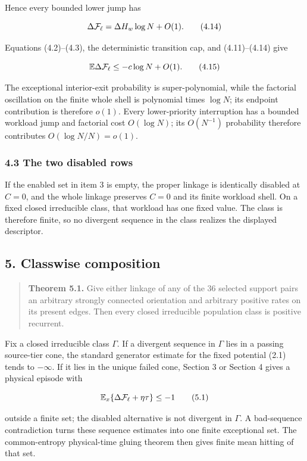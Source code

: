 Hence every bounded lower jump has

\[
 \Delta{\cal F}_\ell=\Delta H_w\log N+O(1).           \tag{4.14}
\]

Equations (4.2)--(4.3), the deterministic transition cap, and
(4.11)--(4.14) give

\[
 \mathbb E\Delta{\cal F}_\ell\le-c\log N+O(1).        \tag{4.15}
\]

The exceptional interior-exit probability is super-polynomial, while the
factorial oscillation on the finite whole shell is polynomial times
\(\log N\); its endpoint contribution is therefore \(o(1)\). Every
lower-priority interruption has a bounded workload jump and factorial
cost \(O(\log N)\); its \(O(N^{-1})\) probability therefore contributes
\(O(\log N/N)=o(1)\).

\subsubsection{4.3 The two disabled rows}

If the enabled set in item 3 is empty, the proper linkage is identically
disabled at \(C=0\), and the whole linkage preserves \(C=0\) and its
finite workload shell. On a fixed closed irreducible class, that
workload has one fixed value. The class is therefore finite, so no
divergent sequence in the class realizes the displayed descriptor.

\subsection{5. Classwise composition}

\begin{quote}
\textbf{Theorem 5.1.} Give either linkage of any of the 36 selected
support pairs an arbitrary strongly connected orientation and arbitrary
positive rates on its present edges. Then every closed irreducible
population class is positive recurrent.
\end{quote}

Fix a closed irreducible class \(\Gamma\). If a divergent sequence in
\(\Gamma\) lies in a passing source-tier cone, the standard generator
estimate for the fixed potential (2.1) tends to \(-\infty\). If it lies
in the unique failed cone, Section 3 or Section 4 gives a physical
episode with

\[
 \mathbb E_x\{\Delta{\cal F}_\ell+\eta\tau\}\le-1      \tag{5.1}
\]

outside a finite set; the disabled alternative is not divergent in
\(\Gamma\). A bad-sequence contradiction turns these sequence estimates
into one finite exceptional set. The common-entropy physical-time gluing
theorem then gives finite mean hitting of that set.

